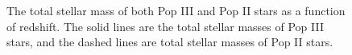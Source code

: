 \documentclass[11pt]{article}
\begin{document}
\begin{figure}[h]
    \centering
    \qquad
    \caption{The total stellar mass of both Pop III and Pop II stars as a function of redshift. The solid lines are the total stellar masses of Pop III stars, and the dashed lines are total stellar masses of Pop II stars.}%
    \label{fig:ratio}%
\end{figure}
\end{document}
